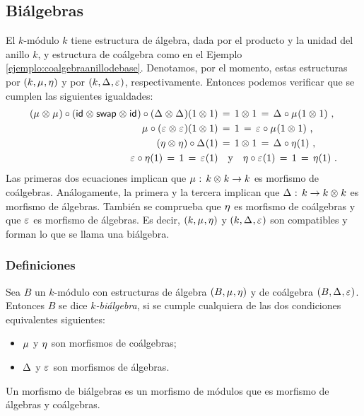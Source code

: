 \subsection{Bi\'{a}lgebras}\label{subsec:coalgebras:bialgebras}

El $k$-m\'{o}dulo $k$ tiene estructura de \'{a}lgebra, dada por el producto y
la unidad del anillo $k$, y  estructura de co\'{a}lgebra como en el Ejemplo~%
\ref{ejemplo:coalgebraanillodebase}. Denotamos, por el momento, estas
estructuras por $(k,\mu_{},\eta_{})$ y por $(k,\Delta_{},\varepsilon_{})$,
respectivamente. Entonces podemos verificar que se cumplen las siguientes
igualdades:
\begin{align*}
	(\mu_{}\otimes_{}\mu_{})\circ(\mathsf{id}_{}\otimes_{}\mathsf{swap}_{}\otimes_{}\mathsf{id}_{})\circ
		(\Delta_{}\otimes_{}\Delta_{})(1\otimes_{} 1) & \,=\,
		1\otimes_{} 1 \,=\,
		\Delta_{}\circ\mu_{}(1\otimes_{} 1) \text{ ,} \\
	\mu_{}\circ(\varepsilon_{}\otimes_{}\varepsilon_{}) (1\otimes_{} 1) & \,=\,
		1 \,=\,\varepsilon_{}\circ\mu_{}(1\otimes_{} 1) \text{ ,} \\
	(\eta_{}\otimes_{}\eta_{})\circ\Delta_{}(1) & \,=\, 1\otimes_{} 1\,=\,
		\Delta_{}\circ\eta_{}(1) \text{ ,} \\
	\varepsilon_{}\circ\eta_{}(1) \,=\,1\,=\,\varepsilon_{}(1) & \quad\text{y}\quad
	\eta_{}\circ\varepsilon_{}(1) \,=\,1\,=\,\eta_{}(1)
	\text{ .}
\end{align*}
%
Las primeras dos ecuaciones implican que $\mu_{}:\,k\otimes_{} k\rightarrow k$
es morfismo de co\'{a}lgebras. An\'{a}logamente, la primera y la tercera
implican que $\Delta_{}:\,k\rightarrow k\otimes_{} k$ es morfismo de
\'{a}lgebras. Tambi\'{e}n se comprueba que $\eta_{}$ es morfismo de
co\'{a}lgebras y que $\varepsilon_{}$ es morfismo de \'{a}lgebras. Es decir,
$(k,\mu_{},\eta_{})$ y $(k,\Delta_{},\varepsilon_{})$ son compatibles y
forman lo que se llama una bi\'{a}lgebra.

\subsubsection{Definiciones}

\begin{defBialgebra}\label{def:bialgebra}
	Sea $B$ un $k$-m\'{o}dulo con estructuras de \'{a}lgebra
	$(B,\mu_{},\eta_{})$ y de co\'{a}lgebra $(B,\Delta_{},\varepsilon_{})$.
	Entonces $B$ se dice \emph{$k$-bi\'{a}lgebra}, si se cumple cualquiera
	de las dos condiciones equivalentes siguientes:
	\begin{itemize}
		\item $\mu_{}$ y $\eta_{}$ son morfismos de co\'{a}lgebras;
		\item $\Delta_{}$ y $\varepsilon_{}$ son morfismos de
			\'{a}lgebras.
	\end{itemize}
	Un morfismo de bi\'{a}lgebras es un morfismo de m\'{o}dulos que es
	morfismo de \'{a}lgebras y co\'{a}lgebras.
\end{defBialgebra}

